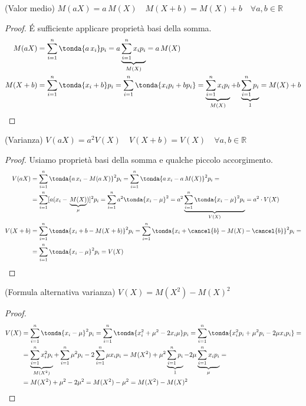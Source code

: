 \begin{proprieta} (Valor medio) \quad \(\boxed{M(aX) = a\, M(X)}  \quad \boxed{M(X+b) = M(X)+b} \quad \forall a,b \in \mathbb{R}\)
 \end{proprieta}
 \begin{proof}
\'E sufficiente applicare proprietà basi della somma.\\
 \[\begin{split}M(aX)&= \sum_{i=1}^n \tonda{a \, x_i } p_i = a \underbrace{\sum_{i=1}^n x_i p_i}_{M(X)} = a \, M(X) \\ 
 M(X+b) &= \sum_{i=1}^n \tonda{x_i+b} p_i = \sum_{i=1}^n \tonda{x_i p_i+b p_i} = \underbrace{\sum_{i=1}^n x_i p_i}_{M(X)} +b  \underbrace{\sum_{i=1}^n p_i}_{1} = M(X)+b\end{split}\]
 \end{proof}
 
  \begin{proprieta} (Varianza) \quad \(\boxed{V(aX) = a^2 V(X)} \quad \boxed{V(X+b) = V(X)} \quad \forall a,b \in \mathbb{R}\)
 \end{proprieta}
 \begin{proof}
 Usiamo proprietà basi della somma e qualche piccolo accorgimento.\\
 \[\begin{split}V(aX)&= \sum_{i=1}^n \tonda{a \,x_i-M(a\,X)}^2 p_i = \sum_{i=1}^n \tonda{a\,x_i-a\,M(X)}^2 p_i =\\&=  \sum_{i=1}^n [a (x_i-\,\underbrace{M(X)}_{\mu})]^2 p_i =\sum_{i=1}^n a^2 \tonda{x_i-\mu}^2 = a^2 \underbrace{\sum_{i=1}^n \tonda{x_i-\mu}^2 p_i }_{V(X)}= a^2 \cdot V(X) \\
 V(X+b) &= \sum_{i=1}^n \tonda{x_i+b-M(X+b)}^2 p_i = \sum_{i=1}^n \tonda{x_i+\cancel{b}-M(X)-\cancel{b}}^2 p_i = \\ &=\sum_{i=1}^n \tonda{x_i-\mu}^2 p_i = V(X) \end{split}\]
 \end{proof}
 
   \begin{proprieta} (Formula alternativa varianza) \quad \(V(X) = M(X^2)-M(X)^2\)
 \end{proprieta}
 \begin{proof}
  \[\begin{split} V(X) &= \sum_{i=1}^n \tonda{x_i-\mu}^2 p_i = \sum_{i=1}^n \tonda{x_i^2+\mu^2-2x_i \mu} p_i =\sum_{i=1}^n \tonda{x_i^2 p_i + \mu^2 p_i - 2 \mu x_i p_i}=\\ &= \underbrace{\sum_{i=1}^n x_i^2 p_i}_{M(X^2)} + \sum_{i=1}^n \mu^2 p_i - 2 \sum_{i=1}^n \mu x_i p_i = M(X^2)+\mu^2 \underbrace{\sum_{i=1}^n p_i}_{1}-2 \mu \underbrace{\sum_{i=1}^n x_i p_i}_{\mu}=\\&=
  M(X^2)+\mu^2-2\mu^2 = M(X^2)-\mu^2 = M(X^2)-M(X)^2 \end{split}\]
 \end{proof}
 
